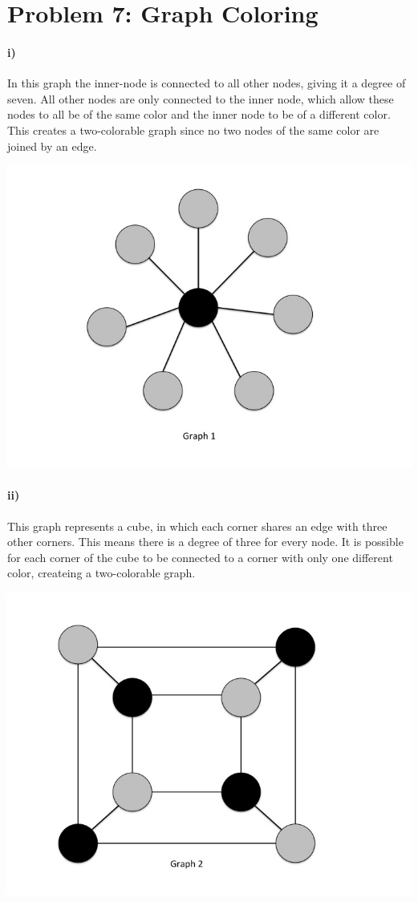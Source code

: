 \documentclass[10pt,letter]{article}
\begin{document}
\section*{Problem 7: Graph Coloring}

\paragraph{i)}
In this graph the inner-node is connected to all other nodes, giving it a degree of seven. All other nodes are only connected to the inner node, which allow these nodes to all be of the same color and the inner node to be of a different color. This creates a two-colorable graph since no two nodes of the same color are joined by an edge. \\
\begin{minipage}{.8\textwidth}
\includegraphics[width=.8\linewidth]{hw3_slide1.jpg}
\end{minipage}

\paragraph{ii)}
This graph represents a cube, in which each corner shares an edge with three other corners. This means there is a degree of three for every node. It is possible for each corner of the cube to be connected to a corner with only one different color, createing a two-colorable graph. \\
\begin{minipage}{.8\textwidth}
\includegraphics[width=.8\linewidth]{hw3_slide2.jpg}
\end{minipage}
\end{document}
